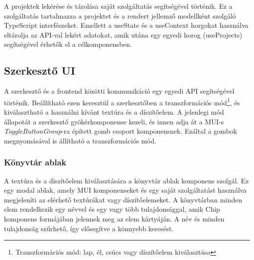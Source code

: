 A projektek lekérése és tárolása saját szolgáltatás segítségével történik. Ez a szolgáltatás tartalmazza a projektet és a rendert jellemző modellként szolgáló TypeScript interfészeket. Emellett a useState és a useContext horgokat használva eltárolja az API-val lekért adatokat, amik utána egy egyedi horog (useProjects) segítségével érhetők el a célkomponensben.

\subsection{Szerkesztő UI}
A szerkesztő és a frontend közötti kommunikáció egy egyedi API segítségével történik. Beállítható ezen keresztül a szerkesztőben a transzformációs mód\footnote{Transzformációs mód: lap, él, csúcs vagy díszítőelem kiválasztása}, és kiválasztható a használni kívánt textúra és a díszítőelem. A jelenlegi mód állapotát a szerkesztő gyökérkomponense kezeli, és innen adja át a MUI-s \emph{ToggleButtonGroup}-ra épített gomb csoport komponensnek. Ezáltal a gombok megnyomásával is állítható a transzformációs mód.

\subsubsection{Könyvtár ablak}
A textúra és a díszítőelem kiválasztására a könyvtár ablak komponens szolgál. Ez egy modal ablak, amely MUI komponenseket és egy saját szolgáltatást használva megjeleníti az elérhető textúrákat vagy díszítőelemeket. A könyvtárban minden elem rendelkezik egy névvel és egy vagy több tulajdonsággal, amik Chip komponens formájában jelennek meg az elem kártyáján. A név és minden tulajdonság szűrhető, így elősegítve a könnyebb keresést.

